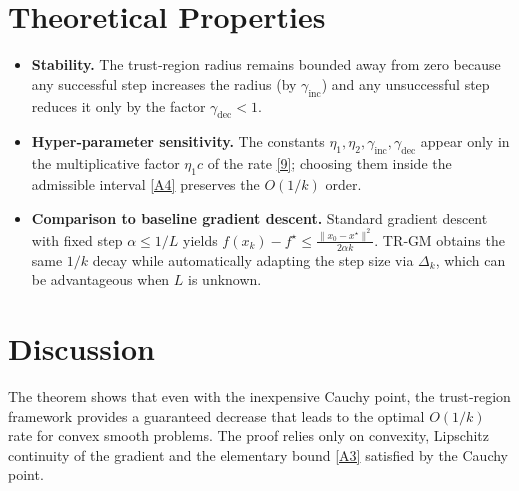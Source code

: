 \documentclass{article}
\begin{document}
\section*{Theoretical Properties}
\begin{itemize}
\item \textbf{Stability.}  The trust‑region radius remains bounded away from
zero because any successful step increases the radius (by $\gamma_{\text{inc}}$)
and any unsuccessful step reduces it only by the factor $\gamma_{\text{dec}}<1$.
\item \textbf{Hyper‑parameter sensitivity.}
The constants $\eta_{1},\eta_{2},\gamma_{\text{inc}},\gamma_{\text{dec}}$
appear only in the multiplicative factor $\eta_{1}c$ of the rate \eqref{9};
choosing them inside the admissible interval \eqref{A4} preserves the $O(1/k)$ order.
\item \textbf{Comparison to baseline gradient descent.}
Standard gradient descent with fixed step $\alpha\le1/L$ yields
$f(x_{k})-f^{\star}\le \frac{\|x_{0}-x^{\star}\|^{2}}{2\alpha k}$.
TR‑GM obtains the same $1/k$ decay while automatically adapting the step
size via $\Delta_{k}$, which can be advantageous when $L$ is unknown.
\end{itemize}

\section*{Discussion}
The theorem shows that even with the inexpensive Cauchy point,
the trust‑region framework provides a guaranteed decrease that leads to the
optimal $O(1/k)$ rate for convex smooth problems.  The proof relies only on
convexity, Lipschitz continuity of the gradient and the elementary bound
\eqref{A3} satisfied by the Cauchy point.

\newpage
\end{document}
